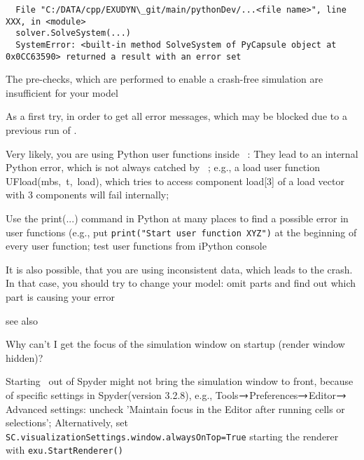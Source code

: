 \begin{lstlisting}
  File "C:/DATA/cpp/EXUDYN\_git/main/pythonDev/...<file name>", line XXX, in <module>
  solver.SolveSystem(...)
  SystemError: <built-in method SolveSystem of PyCapsule object at 0x0CC63590> returned a result with an error set
\end{lstlisting}
%
\item[$\ra$] The pre-checks, which are performed to enable a crash-free simulation are insufficient for your model
%
\item[$\ra$] As a first try,  in order to get all error messages, which may be blocked due to a previous run of \codeName.
%
\item[$\ra$] Very likely, you are using Python user functions inside \codeName\ : They lead to an internal Python error, which is not always catched by \codeName\ ; e.g., a load user function UFload(mbs,~t,~load), which tries to access component load[3] of a load vector with 3 components will fail internally;
%
\item[$\ra$] Use the print(...) command in Python at many places to find a possible error in user functions (e.g., put \texttt{print("Start user function XYZ")} at the beginning of every user function; test user functions from iPython console
%
\item[$\ra$] It is also possible, that you are using inconsistent data, which leads to the crash. In that case, you should try to change your model: omit parts and find out which part is causing your error
%
\item[$\ra$] see also 
\ei

\item Why can't I get the focus of the simulation window on startup (render window hidden)?
\bi
\item[$\ra$] Starting \codeName\ out of Spyder might not bring the simulation window to front, because of specific settings in Spyder(version 3.2.8), e.g., Tools$\ra$Preferences$\ra$Editor$\ra$Advanced settings: uncheck 'Maintain focus in the Editor after running cells or selections'; Alternatively, set \texttt{SC.visualizationSettings.window.alwaysOnTop=True}  starting the renderer with \texttt{exu.StartRenderer()}
\ei
%
\en


